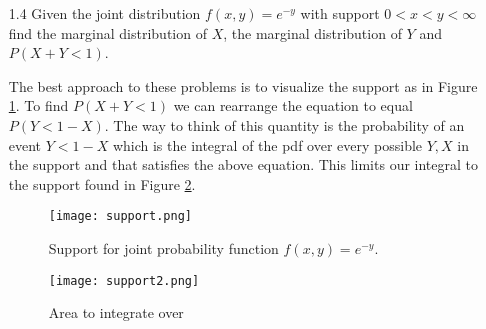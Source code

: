 \begin{enumerate}
I've omitted the last case where the points are on opposite sides since these distances will be larger than 1 so the probability of it being less than 0.5 is 0.

Adding this all up we get around 0.28567.

I verify this in simulation code below:

\begin{lstlisting}[language=Python]
sim_size = 200000
distances = np.zeros(sim_size)
for i in range(sim_size):
    x = np.random.uniform(0,4.0)
    y = np.random.uniform(0,4.0)

    if x <= 1.0:
        point_x = (x,0.)
    elif x > 1.0 and x<=2.0:
        point_x = (1.,x-1)
    elif x > 2.0 and x <= 3.0:
        point_x = (1-(x-2), 1.)
    else:
        point_x = (0, 1-(x-3))
        
    if y <= 1.0:
        point_y = (y,0.)
    elif y > 1.0 and y<=2.0:
        point_y = (1.,y-1)
    elif y > 2.0 and y <= 3.0:
        point_y = (1-(y-2), 1.)
    else:
        point_y = (0, 1-(y-3))
    
    distances[i] = la.norm(np.array(point_x) - np.array(point_y))
    
sum(distances <.5)/(sim_size*1.0)
\end{lstlisting}


\item[1.4]
Given the joint distribution $f(x,y) = e^{-y}$ with support $0<x<y< \infty$ find the marginal distribution of $X$, the marginal distribution of $Y$ and $P(X+Y<1)$.

The best approach to these problems is to visualize the support as in Figure \ref{fig:support}. To find $P(X+Y<1)$ we can rearrange the equation to equal $P(Y<1-X)$. The way to think of this quantity is the probability of an event $Y<1-X$ which is the integral of the pdf over every possible $Y,X$ in the support and that satisfies the above equation. This limits our integral to the support found in Figure \ref{fig:support2}. 

 \begin{figure}[t] \label{fig:support}
\caption{Support for joint probability function $f(x,y) = e^{-y}.$}
\centering
 \texttt{[image: support.png]}
 \end{figure}
 
  \begin{figure}[t] \label{fig:support2}
\caption{Area to integrate over}
\centering
 \texttt{[image: support2.png]}
 \end{figure}
 

\end{enumerate}
